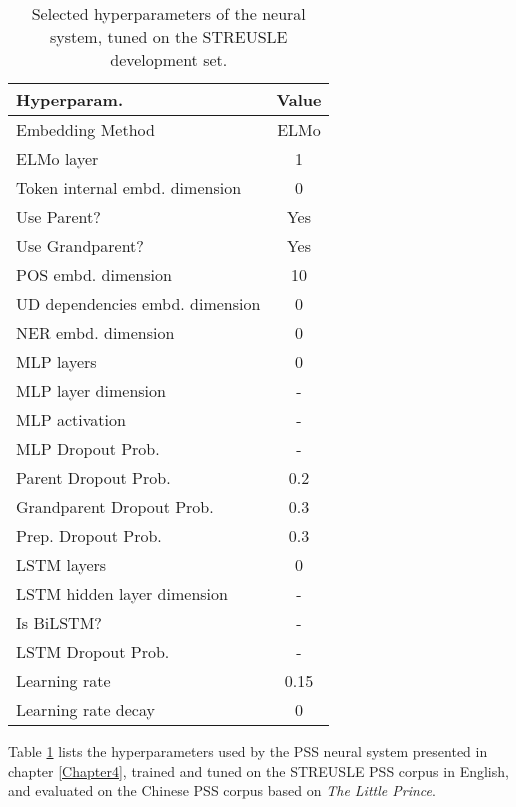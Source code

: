 
\begin{table}[h]
  \small
	\centering
	\begin{tabular}{@{}l|c@{}}
		\toprule
		Hyperparam. & Value \\
		\midrule
        Embedding Method & ELMo \\
        ELMo layer & 1 \\
        Token internal embd. dimension & 0 \\
        Use Parent? & Yes \\
        Use Grandparent? & Yes \\
        POS embd. dimension  & 10 \\
        UD dependencies embd. dimension  & 0 \\
        NER  embd. dimension  & 0 \\
        MLP layers  & 0 \\
        MLP layer dimension  & - \\
        MLP activation  & - \\
        MLP Dropout Prob.  & - \\
        Parent Dropout Prob. & 0.2 \\
        Grandparent Dropout Prob. & 0.3 \\
        Prep. Dropout Prob. & 0.3 \\
        LSTM layers  & 0 \\
        LSTM hidden layer dimension  & - \\
        Is BiLSTM? & - \\
        LSTM Dropout Prob.  & - \\
        Learning rate  & 0.15 \\
        Learning rate decay  & 0 \\
		\bottomrule
	\end{tabular}
	\caption{\label{tab:hyperparamsC}
        Selected hyperparameters of the neural system, tuned on the STREUSLE development set.
	}

\end{table}

Table \ref{tab:hyperparamsC} lists the hyperparameters used by the
PSS neural system presented in chapter \ref{Chapter4}, trained and tuned on the STREUSLE PSS corpus in English, and evaluated on the Chinese PSS corpus based on \textit{The Little Prince}.

